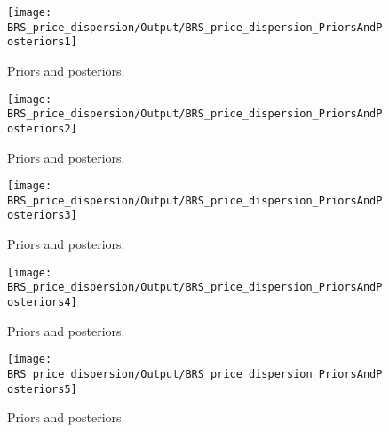  
\begin{figure}[H]
\centering
\texttt{[image: BRS\_price\_dispersion/Output/BRS\_price\_dispersion\_PriorsAndPosteriors1]}
\caption{Priors and posteriors.}\label{Fig:PriorsAndPosteriors:1}
\end{figure}
 
\begin{figure}[H]
\centering
\texttt{[image: BRS\_price\_dispersion/Output/BRS\_price\_dispersion\_PriorsAndPosteriors2]}
\caption{Priors and posteriors.}\label{Fig:PriorsAndPosteriors:2}
\end{figure}
 
\begin{figure}[H]
\centering
\texttt{[image: BRS\_price\_dispersion/Output/BRS\_price\_dispersion\_PriorsAndPosteriors3]}
\caption{Priors and posteriors.}\label{Fig:PriorsAndPosteriors:3}
\end{figure}
 
\begin{figure}[H]
\centering
\texttt{[image: BRS\_price\_dispersion/Output/BRS\_price\_dispersion\_PriorsAndPosteriors4]}
\caption{Priors and posteriors.}\label{Fig:PriorsAndPosteriors:4}
\end{figure}
 
\begin{figure}[H]
\centering
\texttt{[image: BRS\_price\_dispersion/Output/BRS\_price\_dispersion\_PriorsAndPosteriors5]}
\caption{Priors and posteriors.}\label{Fig:PriorsAndPosteriors:5}
\end{figure}
 

